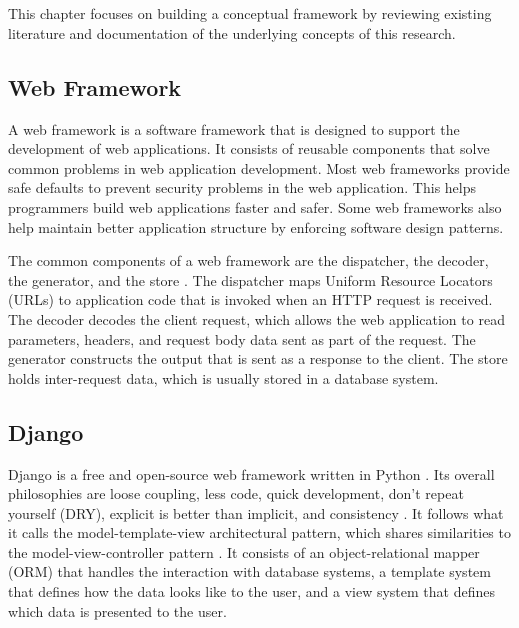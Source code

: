 \chapter{\babDua}

This chapter focuses on building a conceptual framework by reviewing existing
literature and documentation of the underlying concepts of this research.

\section{Web Framework}

A web framework is a software framework that is designed to support the
development of web applications. It consists of reusable components that solve
common problems in web application development. Most web frameworks provide
safe defaults to prevent security problems in the web application. This helps
programmers build web applications faster and safer. Some web frameworks also
help maintain better application structure by enforcing software design
patterns.

The common components of a web framework are the dispatcher, the decoder, the
generator, and the store \cite{schwarz_webframework}. The dispatcher maps
Uniform Resource Locators (URLs) to application code that is invoked when an
HTTP request is received. The decoder decodes the client request, which allows
the web application to read parameters, headers, and request body data sent as
part of the request. The generator constructs the output that is sent as a
response to the client. The store holds inter-request data, which is usually
stored in a database system.

\section{Django}

Django is a free and open-source web framework written in Python \cite{django}.
Its overall philosophies are loose coupling, less code, quick development,
don't repeat yourself (DRY), explicit is better than implicit, and consistency
\cite{django:philosophies}. It follows what it calls the model-template-view
architectural pattern, which shares similarities to the model-view-controller
pattern \cite{django:faq}. It consists of an object-relational mapper (ORM)
that handles the interaction with database systems, a template system that
defines how the data looks like to the user, and a view system that defines
which data is presented to the user.

